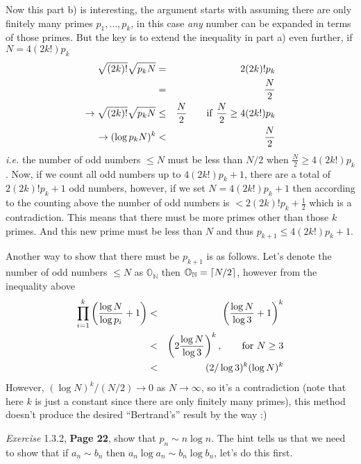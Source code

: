 \documentclass[aps,preprint,preprintnumbers,nofootinbib,showpacs,prd]{revtex4-1}
\newcommand{\ie}{{\it i.e.} }
\newcommand{\nbea}{\begin{eqnarray*}}
\newcommand{\neea}{\end{eqnarray*}}
\DeclarePairedDelimiter{\ceil}{\lceil}{\rceil}
\begin{document}
Now this part b) is interesting, the argument starts with assuming there are only finitely many primes $p_1 , \dots , p_k$, in this case {\it any} number can be expanded in terms of those primes. But the key is to extend the inequality in part a) even further, if $N = 4(2k!)p_k$
%
\nbea
\sqrt{(2k)!} \sqrt{p_k N} & = & 2(2k)!p_k \\
& = & \frac{N}{2} \\
\to \sqrt{(2k)!} \sqrt{p_k N} & \le & \frac{N}{2} ~~~~~ {\rm ~if} ~ \frac{N}{2} \ge 4(2k!)p_k \\
\to (\log p_k N)^k & <  & \frac{N}{2}
\neea
%
\ie the number of odd numbers $\le N$ must be less than $N/2$ when $\frac{N}{2} \ge 4(2k!)p_k$. Now, if we count all odd numbers up to $4(2k!)p_k + 1$, there are a total of $2(2k)!p_k + 1$ odd numbers, however, if we set $N = 4(2k!)p_k + 1$ then according to the counting above the number of odd numbers is $ < 2(2k)!p_k + \frac{1}{2}$ which is a contradiction. This means that there must be more primes other than those $k$ primes. And this new prime must be less than $N$ and thus $p_{k+1} \le 4(2k!)p_k + 1$.

Another way to show that there must be $p_{k+1}$ is as follows. Let's denote the number of odd numbers $\le N$ as $\mathbb{O_N}$ then $\mathbb{O_N} = \ceil{N/2}$, however from the inequality above
%
\nbea
\prod_{i=1}^k \left(\frac{\log N}{\log p_i} + 1\right) & < & \left(\frac{\log N}{\log 3} + 1\right)^k \\
& < & \left(2\frac{\log N}{\log 3}\right)^k, ~~~~~ {\rm~for~} N \ge 3 \\
& < & (2/\log 3)^k (\log N)^k
\neea
%
However, $(\log N)^k/(N/2) \to 0$ as $N\to\infty$, so it's a contradiction (note that here $k$ is just a constant since there are only finitely many primes), this method doesn't produce the desired ``Bertrand's'' result by the way :)

{\it Exercise} 1.3.2, {\bf Page 22}, show that $p_n \sim n \log n$. The hint tells us that we need to show that if $a_n \sim b_n$ then $a_n \log a_n \sim b_n \log b_n$, let's do this first.
\end{document}
